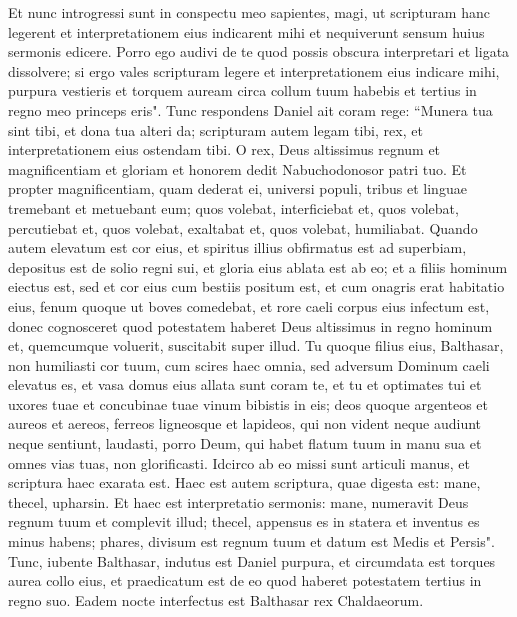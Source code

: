 \begin{biblechapter}
\verse Et nunc introgressi sunt in conspectu meo sapientes, magi, ut scripturam hanc legerent et interpretationem eius indicarent mihi et nequiverunt sensum huius sermonis edicere. 
\verse Porro ego audivi de te quod possis obscura interpretari et ligata dissolvere; si ergo vales scripturam legere et interpretationem eius indicare mihi, purpura vestieris et torquem auream circa collum tuum habebis et tertius in regno meo princeps eris". 
\verse Tunc respondens Daniel ait coram rege: “Munera tua sint tibi, et dona tua alteri da; scripturam autem legam tibi, rex, et interpretationem eius ostendam tibi. 
\verse O rex, Deus altissimus regnum et magnificentiam et gloriam et honorem dedit Nabuchodonosor patri tuo. 
\verse Et propter magnificentiam, quam dederat ei, universi populi, tribus et linguae tremebant et metuebant eum; quos volebat, interficiebat et, quos volebat, percutiebat et, quos volebat, exaltabat et, quos volebat, humiliabat. 
\verse Quando autem elevatum est cor eius, et spiritus illius obfirmatus est ad superbiam, depositus est de solio regni sui, et gloria eius ablata est ab eo; 
\verse et a filiis hominum eiectus est, sed et cor eius cum bestiis positum est, et cum onagris erat habitatio eius, fenum quoque ut boves comedebat, et rore caeli corpus eius infectum est, donec cognosceret quod potestatem haberet Deus altissimus in regno hominum et, quemcumque voluerit, suscitabit super illud. 
\verse Tu quoque filius eius, Balthasar, non humiliasti cor tuum, cum scires haec omnia, 
\verse sed adversum Dominum caeli elevatus es, et vasa domus eius allata sunt coram te, et tu et optimates tui et uxores tuae et concubinae tuae vinum bibistis in eis; deos quoque argenteos et aureos et aereos, ferreos ligneosque et lapideos, qui non vident neque audiunt neque sentiunt, laudasti, porro Deum, qui habet flatum tuum in manu sua et omnes vias tuas, non glorificasti. 
\verse Idcirco ab eo missi sunt articuli manus, et scriptura haec exarata est. 
\verse Haec est autem scriptura, quae digesta est: mane, thecel, upharsin. 
\verse Et haec est interpretatio sermonis: mane, numeravit Deus regnum tuum et complevit illud;  
\verse thecel, appensus es in statera et inventus es minus habens; 
\verse phares, divisum est regnum tuum et datum est Medis et Persis". 
\verse Tunc, iubente Balthasar, indutus est Daniel purpura, et circumdata est torques aurea collo eius, et praedicatum est de eo quod haberet potestatem tertius in regno suo.  
\verse Eadem nocte interfectus est Balthasar rex Chaldaeorum. 
\end{biblechapter}

